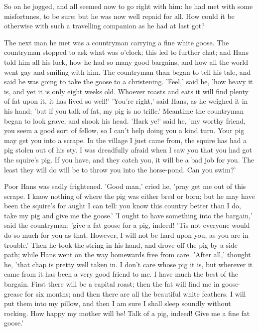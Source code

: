 \documentclass[12pt]{book}
\begin{document}
So on he jogged, and all seemed now to go right with him: he had met
with some misfortunes, to be sure; but he was now well repaid for all.
How could it be otherwise with such a travelling companion as he had
at last got?

The next man he met was a countryman carrying a fine white goose. The
countryman stopped to ask what was o'clock; this led to further chat;
and Hans told him all his luck, how he had so many good bargains, and
how all the world went gay and smiling with him. The countryman than
began to tell his tale, and said he was going to take the goose to a
christening. 'Feel,' said he, 'how heavy it is, and yet it is only
eight weeks old. Whoever roasts and eats it will find plenty of fat
upon it, it has lived so well!' 'You're right,' said Hans, as he
weighed it in his hand; 'but if you talk of fat, my pig is no trifle.'
Meantime the countryman began to look grave, and shook his head. 'Hark
ye!' said he, 'my worthy friend, you seem a good sort of fellow, so I
can't help doing you a kind turn. Your pig may get you into a scrape.
In the village I just came from, the squire has had a pig stolen out
of his sty. I was dreadfully afraid when I saw you that you had got
the squire's pig. If you have, and they catch you, it will be a bad
job for you. The least they will do will be to throw you into the
horse-pond. Can you swim?'

Poor Hans was sadly frightened. 'Good man,' cried he, 'pray get me out
of this scrape. I know nothing of where the pig was either bred or
born; but he may have been the squire's for aught I can tell: you know
this country better than I do, take my pig and give me the goose.' 'I
ought to have something into the bargain,' said the countryman; 'give
a fat goose for a pig, indeed! 'Tis not everyone would do so much for
you as that. However, I will not be hard upon you, as you are in
trouble.' Then he took the string in his hand, and drove off the pig
by a side path; while Hans went on the way homewards free from care.
'After all,' thought he, 'that chap is pretty well taken in. I don't
care whose pig it is, but wherever it came from it has been a very
good friend to me. I have much the best of the bargain. First there
will be a capital roast; then the fat will find me in goose-grease for
six months; and then there are all the beautiful white feathers. I
will put them into my pillow, and then I am sure I shall sleep soundly
without rocking. How happy my mother will be! Talk of a pig, indeed!
Give me a fine fat goose.'
\end{document}
